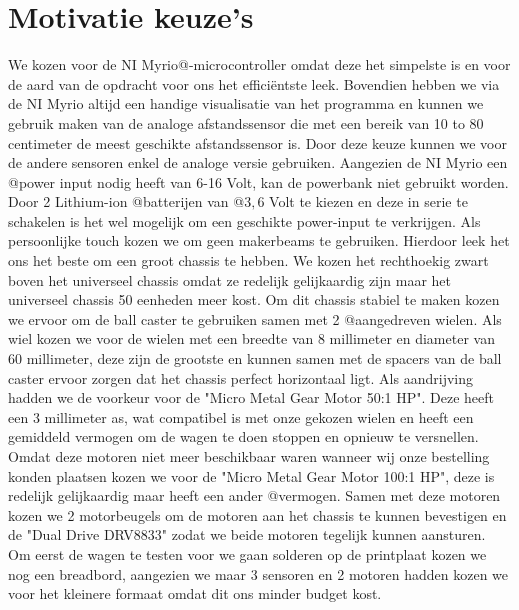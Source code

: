 \documentclass[a4paper,twoside,kulak]{kulakreport}
\begin{document}
	\section*{Motivatie keuze's}
	We kozen voor de NI Myrio@-microcontroller omdat deze het simpelste is en voor de aard van de opdracht voor ons het efficiëntste leek. Bovendien hebben we via de NI Myrio altijd een handige visualisatie van het programma en kunnen we gebruik maken van de analoge afstandssensor die met een bereik van 10 to 80 centimeter de meest geschikte afstandssensor is.
	Door deze keuze kunnen we voor de andere sensoren enkel de analoge versie gebruiken. Aangezien de NI Myrio een @power input nodig heeft van 6-16 Volt, kan de powerbank niet gebruikt worden. Door 2 Lithium-ion @batterijen van @$3,6$ Volt te kiezen en deze in serie te schakelen is het wel mogelijk om een geschikte power-input te verkrijgen.
	Als persoonlijke touch kozen we om geen makerbeams te gebruiken. Hierdoor leek het ons het beste om een groot chassis te hebben. We kozen het rechthoekig zwart boven het universeel chassis omdat ze redelijk gelijkaardig zijn maar het universeel chassis 50 eenheden meer kost. Om dit chassis stabiel te maken kozen we ervoor om de ball caster te gebruiken samen met 2 @aangedreven wielen. Als wiel kozen we voor de wielen met een breedte van 8 millimeter en diameter van 60 millimeter, deze zijn de grootste en kunnen samen met de spacers van de ball caster ervoor zorgen dat het chassis perfect horizontaal ligt. Als aandrijving hadden we de voorkeur voor de "Micro Metal Gear Motor 50:1 HP". Deze heeft een 3 millimeter as, wat compatibel is met onze gekozen wielen en heeft een gemiddeld vermogen om de wagen te doen stoppen en opnieuw te versnellen. Omdat deze motoren niet meer beschikbaar waren wanneer wij onze bestelling konden plaatsen kozen we voor de "Micro Metal Gear Motor 100:1 HP", deze is redelijk gelijkaardig maar heeft een ander @vermogen. Samen met deze motoren kozen we 2 motorbeugels om de motoren aan het chassis te kunnen bevestigen en de "Dual Drive DRV8833" zodat we beide motoren tegelijk kunnen aansturen.
	Om eerst de wagen te testen voor we gaan solderen op de printplaat kozen we nog een breadbord, aangezien we maar 3 sensoren en 2 motoren hadden kozen we voor het kleinere formaat omdat dit ons minder budget kost.  
	
	
\end{document}
